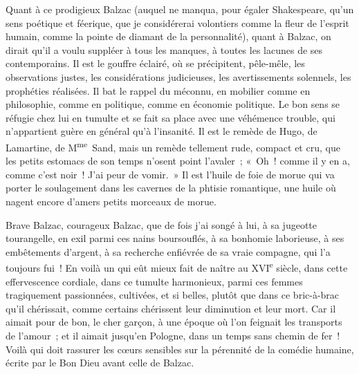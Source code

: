 \documentclass[french,twoside]{book} %
\begin{document}
Quant à ce prodigieux Balzac (auquel ne manqua, pour égaler Shakespeare, qu’un sens poétique et féerique, que je considérerai volontiers comme la fleur de l’esprit humain, comme la pointe de diamant de la personnalité), quant à Balzac, on dirait qu’il a voulu suppléer à tous les manques, à toutes les lacunes de ses contemporains. Il est le gouffre éclairé, où se précipitent, pêle-mêle, les observations justes, les considérations judicieuses, les avertissements solennels, les prophéties réalisées. Il bat le rappel du méconnu, en mobilier comme en philosophie, comme en politique, comme en économie politique. Le bon sens se réfugie chez lui en tumulte et se fait sa place avec une véhémence trouble, qui n’appartient guère en général qu’à l’insanité. Il est le remède de Hugo, de Lamartine, de M\textsuperscript{me} Sand, mais un remède tellement rude, compact et cru, que les petits estomacs de son temps n’osent point l’avaler ; « Oh ! comme il y en a, comme c’est noir ! J’ai peur de vomir. » Il est l’huile de foie de morue qui va porter le soulagement dans les cavernes de la phtisie romantique, une huile où nagent encore d’amers petits morceaux de morue.\par
Brave Balzac, courageux Balzac, que de fois j’ai songé à lui, à sa jugeotte tourangelle, en exil parmi ces nains boursouflés, à sa bonhomie laborieuse, à ses embêtements d’argent, à sa recherche enfiévrée de sa vraie compagne, qui l’a toujours fui ! En voilà un qui eût mieux fait de naître au XVI\textsuperscript{e} siècle, dans cette effervescence cordiale, dans ce tumulte harmonieux, parmi ces femmes tragiquement passionnées, cultivées, et si belles, plutôt que dans ce bric-à-brac qu’il chérissait, comme certains chérissent leur diminution et leur mort. Car il aimait pour de bon, le cher garçon, à une époque où l’on feignait les transports de l’amour ; et il aimait jusqu’en Pologne, dans un temps sans chemin de fer ! Voilà qui doit rassurer les cœurs sensibles sur la pérennité de la comédie humaine, écrite par le Bon Dieu avant celle de Balzac.\par
\end{document}

